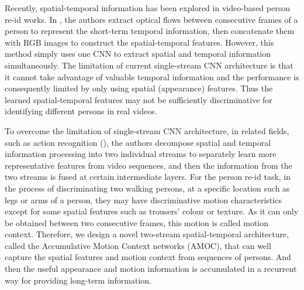 \documentclass[journal]{IEEEtran}
\begin{document}
Recently, spatial-temporal information has been explored in video-based person re-id works\cite{yan2016person,mclaughlinrecurrent, wang2016person, you2016top, liu2015spatio, zhu2016video, gao2016temporally}. In  \cite{mclaughlinrecurrent}, the authors extract optical flows between consecutive frames of a person to represent the short-term temporal information, then concatenate them with RGB images to construct the spatial-temporal features. However, this method simply uses one CNN to extract spatial and temporal information simultaneously. The limitation of current single-stream CNN architecture is that it cannot take  advantage of valuable temporal information and the performance is consequently limited by only using spatial (appearance) features. Thus the learned spatial-temporal features may not be sufficiently discriminative for identifying different persons in real videos.

\IEEEpubidadjcol

To overcome the limitation of single-stream CNN architecture, in related fields, such as action recognition (\cite{simonyan2014two, feichtenhofer2016convolutional}), the authors decompose spatial and temporal information processing into two individual streams to separately learn more representative features  from video sequences, and then the information from the two streams is fused at certain intermediate layers. For the person re-id task, in the process of discriminating two walking persons, at a specific location such as legs or arms of a person, they may have discriminative motion characteristics except for some spatial features such as trousers' colour or texture. As it can only be obtained between two consecutive frames, this motion is called motion context. Therefore, we design a novel two-stream spatial-temporal architecture, called the Accumulative Motion Context networks (AMOC), that can well capture the spatial features and motion context from sequences of persons. And then the useful appearance and motion information is accumulated  in a recurrent way for providing long-term information. 
\end{document}
